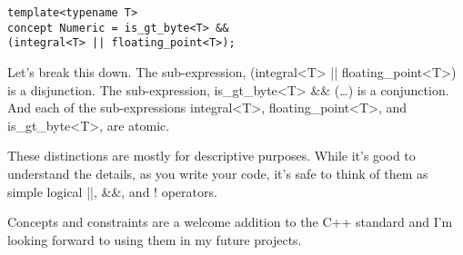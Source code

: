\begin{lstlisting}[style=styleCXX]
template<typename T>
concept Numeric = is_gt_byte<T> &&
(integral<T> || floating_point<T>);
\end{lstlisting}

Let's break this down. The sub-expression, (integral<T> || floating\_point<T>) is a disjunction. The sub-expression, is\_gt\_byte<T> \&\& (…) is a conjunction. And each of the sub-expressions integral<T>, floating\_point<T>, and is\_gt\_byte<T>, are atomic.

These distinctions are mostly for descriptive purposes. While it's good to understand the details, as you write your code, it's safe to think of them as simple logical ||, \&\&, and ! operators.

Concepts and constraints are a welcome addition to the C++ standard and I'm looking forward to using them in my future projects.







